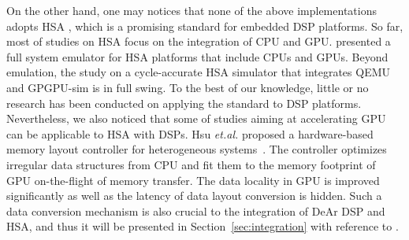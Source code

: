     On the other hand, one may notices that none of the above implementations adopts HSA \cite{systemspec}, which is a promising standard for embedded DSP platforms.
    So far, most of studies on HSA focus on the integration of CPU and GPU. 
    \cite{hsaemu} presented a full system emulator for HSA platforms that include CPUs and GPUs.
    Beyond emulation, the study on a cycle-accurate HSA simulator that integrates QEMU \cite{qemu} and GPGPU-sim \cite{gpgpusim} is in full swing.
    To the best of our knowledge, little or no research has been conducted on applying the standard to DSP platforms.
    \\\indent
    Nevertheless, we also noticed that some of studies aiming at accelerating GPU can be applicable to HSA with DSPs.
    Hsu \textit{et.al.} proposed a hardware-based memory layout controller for heterogeneous systems~\cite{sc}.
    The controller optimizes irregular data structures from CPU and fit them to the memory footprint of GPU on-the-flight of memory transfer.
    The data locality in GPU is improved significantly as well as the latency of data layout conversion is hidden.
    Such a data conversion mechanism is also crucial to the integration of DeAr DSP and HSA, 
    and thus it will be presented in Section~\ref{sec:integration} with reference to \cite{sc}.
